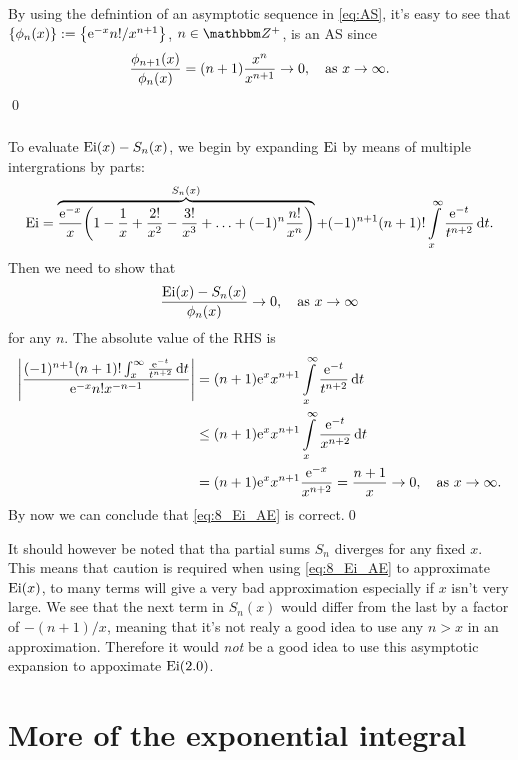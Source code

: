 \documentclass[11pt,letter, swedish, english
]{article}
\newcommand{\Ei}{\ensuremath\mathrm{Ei}}
\begin{document}
\setcounter{subsubsection}{0}
\renewcommand{\thesubsubsection}{\arabic{section} (\alph{subsection}\roman{subsubsection})}
\subsubsection{}%
By using the defnintion of an asymptotic sequence in \eqref{eq:AS},
it's easy to see that $\{\phi_n(x)\}:=\qty{\mathrm{e}^{-x}n!/x^{n+1}}$,
$n\in\Z^+$, is an AS since
\begin{equation}
\frac{\phi_{n+1}(x)}{\phi_n(x)}=(n+1)\frac{x^n}{x^{n+1}}\to0\as x\to\infty.
\end{equation}
\qed

\subsubsection{}
To evaluate $\Ei(x)-S_n(x)$, we begin by expanding $\Ei$ by means of
multiple intergrations by parts:
\begin{equation}
\Ei = \overbrace{\frac{\ee^{-x}}{x}
\qty(1-\frac{1}{x}+\frac{2!}{x^2}-\frac{3!}{x^3}+\ldots+(-1)^n\frac{n!}{x^n})
}^{S_n(x)}
+(-1)^{n+1} (n+1)! \int_x^\infty\frac{\ee^{-t}}{t^{n+2}}\id{t}.
\end{equation}
Then we need to show that
\begin{equation}
\frac{\Ei(x)-S_n(x)}{\phi_n(x)}\to0\as x\to\infty
\end{equation}
for any $n$. The absolute value of the RHS is
\begin{equation}
\begin{aligned}
\abs{\frac{(-1)^{n+1}(n+1)!\oldint_x^\infty\frac{\ee^{-t}}{t^{n+2}}\id{t}}
{\ee^{-x}n!x^{-n-1}}} &=
(n+1)\ee^{x}x^{n+1}\int_x^\infty\frac{\ee^{-t}}{t^{n+2}}\id{t}\\
&\le (n+1)\ee^{x}x^{n+1}\int_x^\infty\frac{\ee^{-t}}{x^{n+2}}\id{t}\\
&=(n+1)\ee^{x}x^{n+1}\frac{\ee^{-x}}{x^{n+2}} 
= \frac{n+1}{x}\to0\as x\to\infty.
\end{aligned}
\end{equation}
By now we can conclude that \eqref{eq:8_Ei_AE} is correct.\qed

It should however be noted that tha partial sums $S_n$ diverges for
any fixed $x$. This means that caution is required when using
\eqref{eq:8_Ei_AE} to approximate $\Ei(x)$, to many terms will give a
very bad approximation especially if $x$ isn't very large. We see that
the next term in $S_n(x)$ would differ from the last by a factor of
$-(n+1)/x$, meaning that it's not realy a good idea to use any $n>x$
in an approximation. Therefore it would \emph{not} be a good idea to
use this asymptotic expansion to appoximate $\Ei(2.0)$.



\section{More of the exponential integral}
\renewcommand{\thesubsubsection}{\arabic{section} (\alph{subsection},\,\roman{subsubsection})}
\end{document}
